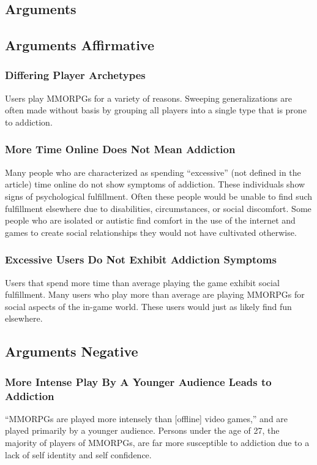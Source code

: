 \documentclass[11pt]{article}
\begin{document}
\begin{multicols}{2}
\section{Arguments}
\subsection{Arguments Affirmative}
\subsubsection{Differing Player Archetypes}
Users play MMORPGs for a variety of reasons. Sweeping generalizations are often made without basis by grouping all players into a single type that is prone to addiction. \cite{PlayerMotivations}
\subsubsection{More Time Online Does Not Mean Addiction}
Many people who are characterized as spending ``excessive'' (not defined in the article) time online do not show symptoms of addiction. These individuals show signs of psychological fulfillment. Often these people would be unable to find such fulfillment elsewhere due to disabilities, circumstances, or social discomfort. Some people who are isolated or autistic find comfort in the use of the internet and games to create social relationships they would not have cultivated otherwise. \cite{IsThereEvidenceOfInternetAddiction}
\subsubsection{Excessive Users Do Not Exhibit Addiction Symptoms}
Users that spend more time than average playing the game exhibit social fulfillment. Many users who play more than average are playing MMORPGs for social aspects of the in-game world. These users would just as likely find fun elsewhere. \cite{ExcessiveUseForSocialAspects}
\subsection{Arguments Negative}
\subsubsection{More Intense Play By A Younger Audience Leads to Addiction}
``MMORPGs are played more intensely than [offline] video games,'' and are played primarily by a younger audience. Persons under the age of 27, the majority of players of MMORPGs, are far more susceptible to addiction due to a lack of self identity and self confidence. \cite{YoungerAudiencesGetAddicted}

\end{multicols}
\end{document}
